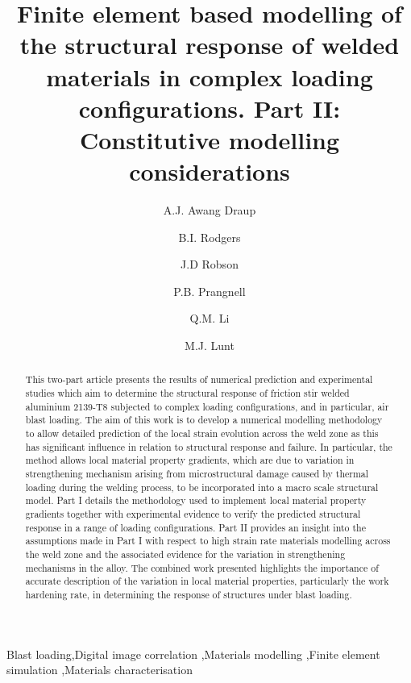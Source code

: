 	\begin{frontmatter}
		\title{Finite element based modelling of the structural response of welded materials in complex loading configurations. %
			Part II: Constitutive modelling considerations}
		\author[1]{A.J. Awang Draup }
		\author[1]{B.I. Rodgers}
		\author[1]{J.D Robson}
		\author[1]{P.B. Prangnell}
		\author[1]{Q.M. Li}
		\address[1]{The University of Manchester, Manchester, M13 9PL, UK}
		\author[2]{M.J. Lunt}
		\address[2]{DSTL, Porton, SP4 0JQ, UK}
		
		\begin{abstract}
			This two-part article presents the results of numerical  prediction and experimental studies which aim to determine the structural response of friction stir welded aluminium 2139-T8 subjected to complex loading configurations, and in particular, air blast loading. The aim of this work is to develop a numerical modelling methodology to allow detailed prediction of the local strain evolution across the weld zone as this has significant influence in relation to structural response and failure. In particular, the method allows local material property gradients, which are due to variation in strengthening mechanism arising from microstructural damage caused by thermal loading during the welding process, to be incorporated into a macro scale structural model. Part I details the methodology used to implement local material property gradients together with experimental evidence to verify the predicted structural response in a range of loading configurations. Part II provides an insight into the assumptions made in Part I with respect to high strain rate materials modelling across the weld zone and the associated evidence for the variation in strengthening mechanisms in the alloy. The combined work presented highlights the importance of accurate description of the variation in local material properties, particularly the work hardening rate, in determining the response of structures under blast loading.
		\end{abstract}
		
		\begin{keyword}
			Blast loading\sep Digital image correlation \sep Materials modelling \sep Finite element simulation \sep Materials characterisation
		\end{keyword}
		
	\end{frontmatter}
	
